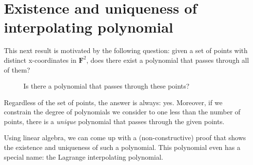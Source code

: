 \documentclass{article}
\numberwithin{equation}{section}
\begin{document}
\section{Existence and uniqueness of interpolating polynomial}

This next result is motivated by the following question: given a set of points with distinct x-coordinates in $\mathbf{F}^2$, does there exist a polynomial that passes through all of them?

\begin{figure}[h]
  \centering
  \caption{Is there a polynomial that passes through these points?}
\end{figure}

Regardless of the set of points, the answer is always: yes. Moreover, if we constrain the degree of polynomials we consider to one less than the number of points, there is a \textit{unique} polynomial that passes through the given points.

Using linear algebra, we can come up with a (non-constructive) proof that shows the existence and uniqueness of such a polynomial. This polynomial even has a special name: the Lagrange interpolating polynomial.
\end{document}
